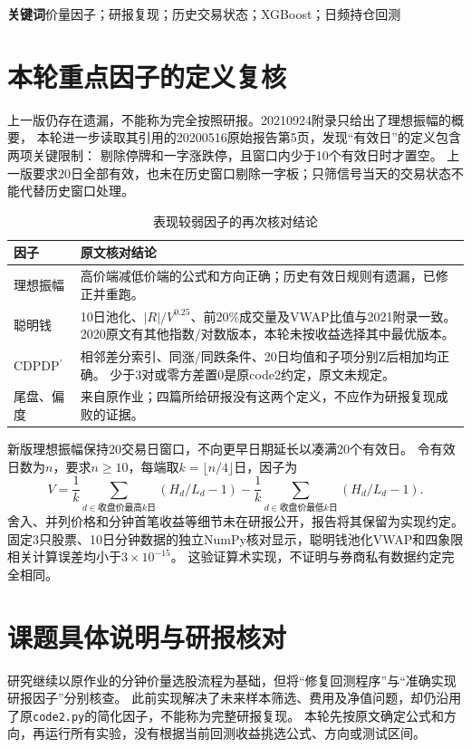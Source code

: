 \documentclass[UTF8,zihao=-4,fontset=fandol]{ctexart}
\begin{document}
\noindent\textbf{关键词}\quad 价量因子；研报复现；历史交易状态；XGBoost；日频持仓回测
\vspace{3mm}\tableofcontents

\clearpage
\section{本轮重点因子的定义复核}
上一版仍存在遗漏，不能称为完全按照研报。20210924附录只给出了理想振幅的概要，
本轮进一步读取其引用的20200516原始报告第5页，发现“有效日”的定义包含两项关键限制：
剔除停牌和一字涨跌停，且窗口内少于10个有效日时才置空。
上一版要求20日全部有效，也未在历史窗口剔除一字板；只筛信号当天的交易状态不能代替历史窗口处理。

\begin{table}[H]\centering\small
\caption{表现较弱因子的再次核对结论}
\begin{tabularx}{\linewidth}{p{26mm}X}\toprule
因子 & 原文核对结论\\\midrule
理想振幅 & 高价端减低价端的公式和方向正确；历史有效日规则有遗漏，已修正并重跑。\\
聪明钱 & 10日池化、$|R|/V^{0.25}$、前20\%成交量及VWAP比值与2021附录一致。
2020原文有其他指数/对数版本，本轮未按收益选择其中最优版本。\\
CDPDP$^{\prime}$ & 相邻差分索引、同涨/同跌条件、20日均值和子项分别Z后相加均正确。
少于3对或零方差置0是原code2约定，原文未规定。\\
尾盘、偏度 & 来自原作业；四篇所给研报没有这两个定义，不应作为研报复现成败的证据。\\\bottomrule
\end{tabularx}\end{table}

新版理想振幅保持20交易日窗口，不向更早日期延长以凑满20个有效日。
令有效日数为$n$，要求$n\geq10$，每端取$k=\lfloor n/4\rfloor$日，因子为
\[
V=\frac1k\sum_{d\in\text{收盘价最高}k\text{日}}(H_d/L_d-1)
 -\frac1k\sum_{d\in\text{收盘价最低}k\text{日}}(H_d/L_d-1).
\]
舍入、并列价格和分钟首笔收益等细节未在研报公开，报告将其保留为实现约定。
固定3只股票、10日分钟数据的独立NumPy核对显示，聪明钱池化VWAP和四象限相关计算误差均小于$3\times10^{-15}$。
这验证算术实现，不证明与券商私有数据约定完全相同。

\clearpage
\section{课题具体说明与研报核对}
研究继续以原作业的分钟价量选股流程为基础，但将“修复回测程序”与“准确实现研报因子”分别核查。
此前实现解决了未来样本筛选、费用及净值问题，却仍沿用了原\texttt{code2.py}的简化因子，不能称为完整研报复现。
本轮先按原文确定公式和方向，再运行所有实验，没有根据当前回测收益挑选公式、方向或测试区间。
\end{document}
